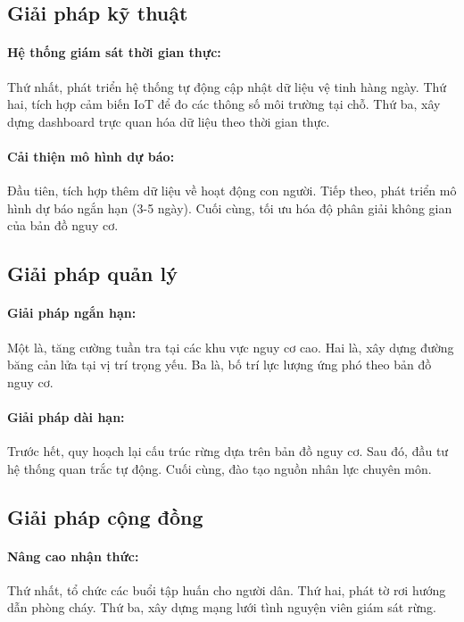\documentclass{article}
\begin{document}
\subsection{Giải pháp kỹ thuật}
\paragraph{Hệ thống giám sát thời gian thực:}
Thứ nhất, phát triển hệ thống tự động cập nhật dữ liệu vệ tinh hàng ngày. Thứ hai, tích hợp cảm biến IoT để đo các thông số môi trường tại chỗ. Thứ ba, xây dựng dashboard trực quan hóa dữ liệu theo thời gian thực.

\paragraph{Cải thiện mô hình dự báo:}
Đầu tiên, tích hợp thêm dữ liệu về hoạt động con người. Tiếp theo, phát triển mô hình dự báo ngắn hạn (3-5 ngày). Cuối cùng, tối ưu hóa độ phân giải không gian của bản đồ nguy cơ.

\subsection{Giải pháp quản lý}
\paragraph{Giải pháp ngắn hạn:}
Một là, tăng cường tuần tra tại các khu vực nguy cơ cao. Hai là, xây dựng đường băng cản lửa tại vị trí trọng yếu. Ba là, bố trí lực lượng ứng phó theo bản đồ nguy cơ.

\paragraph{Giải pháp dài hạn:}
Trước hết, quy hoạch lại cấu trúc rừng dựa trên bản đồ nguy cơ. Sau đó, đầu tư hệ thống quan trắc tự động. Cuối cùng, đào tạo nguồn nhân lực chuyên môn.

\subsection{Giải pháp cộng đồng}
\paragraph{Nâng cao nhận thức:}
Thứ nhất, tổ chức các buổi tập huấn cho người dân. Thứ hai, phát tờ rơi hướng dẫn phòng cháy. Thứ ba, xây dựng mạng lưới tình nguyện viên giám sát rừng.
\end{document}
